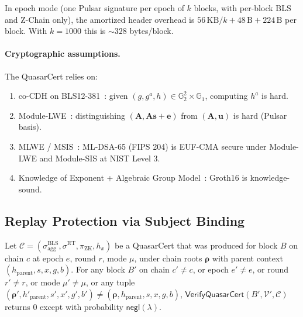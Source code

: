\begin{remark}
In epoch mode (one Pulsar signature per epoch of $k$ blocks, with
per-block BLS and Z-Chain only), the amortized header overhead is
$56\,\text{KB}/k + 48\,\text{B} + 224\,\text{B}$ per block. With $k =
1000$ this is ${\sim}328$ bytes/block.
\end{remark}

\paragraph{Cryptographic assumptions.}
The QuasarCert relies on:
\begin{enumerate}[leftmargin=2em,nosep]
  \item co-CDH on BLS12-381~\cite{boneh2001short}: given
    $(g, g^a, h) \in \mathbb{G}_2^2 \times \mathbb{G}_1$, computing
    $h^a$ is hard.
  \item Module-LWE~\cite{regev2005}: distinguishing
    $(\mathbf{A}, \mathbf{As}+\mathbf{e})$ from $(\mathbf{A},
    \mathbf{u})$ is hard (Pulsar basis).
  \item MLWE / MSIS~\cite{nist-pqc}: ML-DSA-65 (FIPS 204) is EUF-CMA
    secure under Module-LWE and Module-SIS at NIST Level 3.
  \item Knowledge of Exponent + Algebraic Group Model~\cite{groth2016}:
    Groth16 is knowledge-sound.
\end{enumerate}

\subsection{Replay Protection via Subject Binding}
\label{sec:replay}

\begin{theorem}
\label{thm:replay-impossible}
Let $\mathcal{C} = (\sigma^{\mathrm{BLS}}_{\mathrm{agg}},
\sigma^{\mathrm{RT}}, \pi_{\mathrm{ZK}}, h_x)$ be a QuasarCert that was
produced for block $B$ on chain $c$ at epoch $e$, round $r$, mode $\mu$,
under chain roots $\boldsymbol{\rho}$ with parent context
$(h_{\text{parent}}, s, x, g, b)$. For any block $B'$ on chain
$c' \neq c$, or epoch $e' \neq e$, or round $r' \neq r$, or mode
$\mu' \neq \mu$, or any tuple $(\boldsymbol{\rho}', h'_{\text{parent}},
s', x', g', b') \neq (\boldsymbol{\rho}, h_{\text{parent}}, s, x, g, b)$,
$\mathsf{VerifyQuasarCert}(B', \mathcal{V}', \mathcal{C})$ returns 0
except with probability $\mathsf{negl}(\lambda)$.
\end{theorem}

